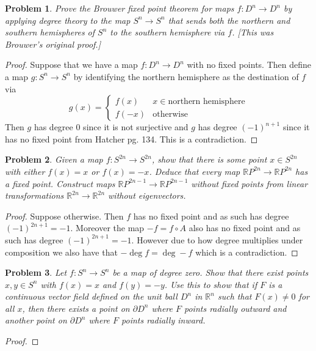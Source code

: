 \documentclass[10pt]{article}
\newcommand{\sk}{\vskip 10mm}
\newcommand{\bb}[1]{\mathbb{#1}}
\theoremstyle{plain}
\newtheorem{problem}{Problem}
\theoremstyle{remark}
\begin{document}
\begin{problem}
  Prove the Brouwer fixed point theorem for maps $f:D^n\rightarrow D^n$
  by applying degree theory to the map $S^n\rightarrow S^n$ that sends
  both the northern and southern hemispheres of $S^n$ to the
  southern hemisphere via $f$. [This was Brouwer's original proof.]
\end{problem}

\begin{proof}
  Suppose that we have a map $f:D^n\rightarrow D^n$ with no fixed points.
  Then define a map $g:S^n\rightarrow S^n$ by identifying the northern
  hemisphere as the destination of $f$ via
  \[
    g(x) =
    \left\{
      \begin{array}{ll}
        f(x) & x\in \text{northern hemisphere}\\
        f(-x) & \text{otherwise}               
      \end{array}
    \right.
  \]
  Then $g$ has degree 0 since it is not surjective and $g$
  has degree $(-1)^{n+1}$ since it has no fixed point from Hatcher pg. 134.
  This is a contradiction.
\end{proof}

\sk

\begin{problem}
  Given a map $f:S^{2n}\rightarrow S^{2n}$, show that there is some point
  $x\in S^{2n}$ with either $f(x)=x$ or $f(x)=-x$. Deduce that
  every map $\bb{R}P^{2n}\rightarrow \bb{R}P^{2n}$ has a fixed point.
  Construct maps $\bb{R}P^{2n-1}\rightarrow\bb{R}P^{2n-1}$ without fixed points
  from linear transformations $\bb{R}^{2n}\rightarrow\bb{R}^{2n}$ without
  eigenvectors.
\end{problem}

\begin{proof}
  Suppose otherwise. Then $f$ has no fixed point and as such
  has degree $(-1)^{2n+1}=-1$. Moreover the map $-f=f\circ A$ also
  has no fixed point and as such has degree $(-1)^{2n+1}=-1$.
  However due to how degree multiplies under composition we also
  have that $-\deg f=\deg -f$ which is a contradiction.
\end{proof}

\sk

\begin{problem}
  Let $f:S^n\rightarrow S^n$ be a map of degree zero. Show that there exist
  points $x,y\in S^n$ with $f(x)=x$ and $f(y)=-y$. Use this to show
  that if $F$ is a continuous vector field defined on the unit
  ball $D^n$ in $\bb{R}^n$ such that $F(x)\neq 0$ for all $x$, then
  there exists a point on $\partial D^n$ where $F$ points radially outward
  and another point on $\partial D^n$ where $F$ points radially inward.
\end{problem}

\begin{proof}
  
\end{proof}

\end{document}
